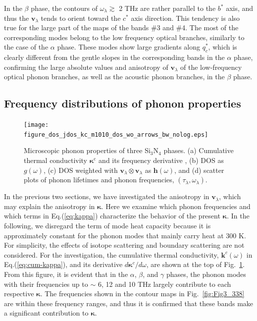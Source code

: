 \documentclass[twocolumn,amsmath,amssymb,a4paper,prb,superscriptaddress,floatfix]{revtex4-1}
\begin{document}
In the $\beta$ phase, the contours of $\omega_{\lambda} \gtrsim$ 2 THz are
rather parallel to the $b^*$ axis, and thus the $\mathbf{v}_{\lambda}$ tends to
orient toward the $c^*$ axis direction. This tendency is also true for the
large part of the maps of the bands \#3 and \#4. The most of the corresponding modes belong
to the low frequency optical branches, similarly to the case of the $\alpha$ phase.
These modes show large gradients along $q_c^*$, which is clearly different from
the gentle slopes in the corresponding bands in the $\alpha$ phase, confirming
the large absolute values and anisotropy of $\mathbf{v}_{\lambda}$ of the
low-frequency optical phonon branches, as well as the acoustic phonon branches,
in the $\beta$ phase.


\subsection{Frequency distributions of phonon properties}

\begin{figure}[ht]
 \begin{center}
	 \texttt{[image: figure\_dos\_jdos\_kc\_m1010\_dos\_wo\_arrows\_bw\_nolog.eps]}
  \caption{Microscopic phonon properties of three Si$_3$N$_4$
	  phases. (a) Cumulative thermal conductivity $\boldsymbol{\kappa}^\text{c}$ and
	  its frequency derivative
	  , (b) DOS as $g(\omega)$, (c) DOS weighted with $\mathbf{v}_\lambda \otimes
	  \mathbf{v}_\lambda$ as $\boldsymbol{h}(\omega)$, and (d) scatter plots of phonon
	  lifetimes and phonon frequencies, $(\tau_\lambda,\omega_\lambda)$.
  \label{fig:Fig5_338_rev} }
 \end{center}
\end{figure}

In the previous two sections, we have investigated the anisotropy in
$\mathbf{v}_\lambda$, which may explain the anisotropy in $\boldsymbol{\kappa}$.
Here we examine which phonon frequencies and which terms in Eq.(\ref{eq:kappa})
characterize the behavior of the present $\boldsymbol{\kappa}$. In the
following, we disregard the term of mode heat capacity because it is
approximately constant for the phonon modes that mainly carry heat at 300 K.
For simplicity, the effects of isotope scattering and boundary scattering are
not considered.  For the investigation, the cumulative thermal conductivity,
$\boldsymbol{k}^c(\omega)$ in Eq.(\ref{eq:cum-kappa}), and its derivative
$d\boldsymbol{\kappa}^c/d\omega$, are shown at the top of
Fig.~\ref{fig:Fig5_338_rev}. From this figure, it is evident that in the
$\alpha$, $\beta$, and $\gamma$ phases, the phonon modes with their frequencies
up to $\sim$ 6, 12 and 10 THz largely contribute to each respective
$\boldsymbol{\kappa}$. The frequencies shown in the contour maps in
Fig.~\ref{fig:Fig3_338} are within these frequency ranges, and thus it is
confirmed that these bands make a significant contribution to
$\boldsymbol{\kappa}$.  
\end{document}
